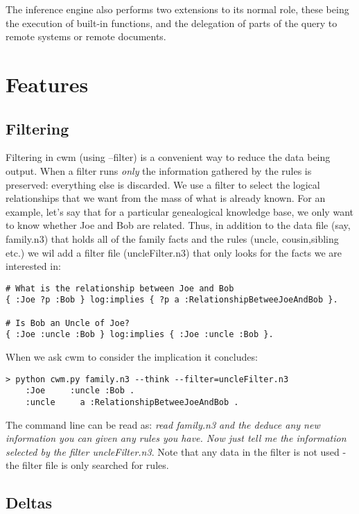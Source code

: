 \documentclass{tlp}
\begin{document}
\par The inference engine also performs two extensions to its normal
role, these being the execution of built-in functions, and the
delegation of parts of the query to remote systems or remote
documents.
\section{Features}
  
\subsection{Filtering}
  

\par Filtering in cwm (using --filter) is a convenient way to reduce
the data being output. When a filter runs {\em only} the
information gathered by the rules is preserved: everything else is
discarded. We use a filter to select the logical relationships that
we want from the mass of what is already known.
For an example, let's say that for a particular genealogical
knowledge base, we only want to know whether Joe and Bob are
related. Thus, in addition to the data file (say, family.n3) that
holds all of the family facts and the rules (uncle, cousin,sibling
etc.) we wil add a filter file (uncleFilter.n3) that only looks for
the facts we are interested in:
\begin{verbatim}
# What is the relationship between Joe and Bob
{ :Joe ?p :Bob } log:implies { ?p a :RelationshipBetweeJoeAndBob }.

# Is Bob an Uncle of Joe?
{ :Joe :uncle :Bob } log:implies { :Joe :uncle :Bob }.
\end{verbatim}

\par When we ask cwm to consider the implication it concludes:
\begin{verbatim}
> python cwm.py family.n3 --think --filter=uncleFilter.n3
    :Joe     :uncle :Bob .
    :uncle     a :RelationshipBetweeJoeAndBob .
\end{verbatim}

\par The command line can be read as: {\em read family.n3 and the
deduce any new information you can given any rules you have. Now
just tell me the information selected by the filter
uncleFilter.n3}. Note that any data in the filter is
not used - the filter file is only searched for
rules.
\subsection{Deltas}
  
\end{document}
